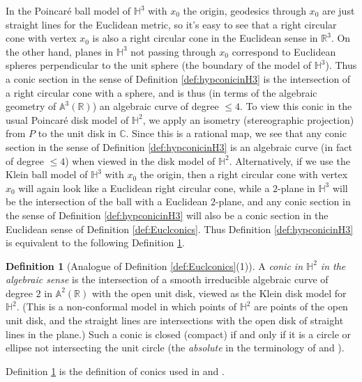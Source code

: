 \documentclass[12pt]{amsart}
\theoremstyle{definition}
\newtheorem{definition}[theorem]{Definition}
\begin{document}
In the Poincar\'e ball 
model of ${\mathbb H}^3$ with $x_0$ the origin, geodesics through
$x_0$ are just straight lines for the Euclidean metric, so it's easy
to see that a right circular cone with vertex $x_0$ is also a right
circular cone in the Euclidean sense in ${\mathbb R}^3$.  On the other hand,
planes in ${\mathbb H}^3$ not passing through $x_0$ correspond to Euclidean
spheres perpendicular to the unit sphere (the boundary of the model of
${\mathbb H}^3$).  Thus a conic section in the sense of Definition
\ref{def:hypconicinH3} is the intersection of a right circular cone
with a sphere, and is thus (in terms of the algebraic geometry of
${\mathbb A}^3({\mathbb R})$) an algebraic curve of degree $\le 4$. To view this conic
in the usual Poincar\'e disk model of ${\mathbb H}^2$, we apply an 
isometry (stereographic projection) from $P$ to the unit disk in
${\mathbb C}$. Since this is a rational map, we see that any conic section in
the sense of Definition \ref{def:hypconicinH3} is an algebraic curve
(in fact of degree $\le 4$) when viewed in the disk model of ${\mathbb H}^2$.
Alternatively, if we use the Klein ball model of ${\mathbb H}^3$ with $x_0$ the
origin, then a right circular cone with vertex $x_0$ will again look
like a Euclidean right circular cone, while a $2$-plane in ${\mathbb H}^3$
will be the intersection of the ball with 
a Euclidean $2$-plane, and any conic section in the
sense of Definition \ref{def:hypconicinH3} will also be a conic
section in the Euclidean sense of Definition \ref{def:Euclconics}.
Thus Definition \ref{def:hypconicinH3} is equivalent to the following
Definition \ref{def:alghypconic}.
\begin{definition}[{Analogue of Definition \ref{def:Euclconics}(1)}]
A \emph{conic in ${\mathbb H}^2$ in the algebraic sense} is the intersection of a
smooth irreducible algebraic curve of degree $2$
in ${\mathbb A}^2({\mathbb R})$ with the open unit
disk, viewed as the Klein disk model for ${\mathbb H}^2$. (This is a
non-conformal model in which points of ${\mathbb H}^2$ are points of the open
unit disk, and the straight lines are intersections with
the open disk of straight lines in the plane.) Such a conic is
closed (compact) if and only if it is a circle or ellipse not
intersecting the unit circle (the \emph{absolute} in the terminology
of \cite{MR1505334} and \cite{MR1628013}).
\label{def:alghypconic}
\end{definition}

Definition \ref{def:alghypconic} is the definition of conics used in
\cite{MR1505334} and \cite{MR1628013}.
\end{document}
